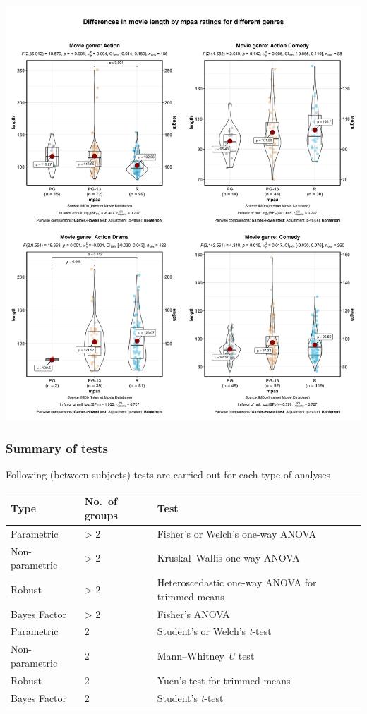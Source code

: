 \documentclass[]{article}
\begin{document}
\includegraphics[width=1\linewidth]{./figures/paper-ggbetweenstats3-1}

\hypertarget{summary-of-tests}{%
\subsubsection{Summary of tests}\label{summary-of-tests}}

Following (between-subjects) tests are carried out for each type of analyses-

\begin{longtable}[]{@{}lll@{}}
\toprule
Type & No.~of groups & Test\tabularnewline
\midrule
\endhead
Parametric & \textgreater{} 2 & Fisher's or Welch's one-way ANOVA\tabularnewline
Non-parametric & \textgreater{} 2 & Kruskal--Wallis one-way ANOVA\tabularnewline
Robust & \textgreater{} 2 & Heteroscedastic one-way ANOVA for trimmed means\tabularnewline
Bayes Factor & \textgreater{} 2 & Fisher's ANOVA\tabularnewline
Parametric & 2 & Student's or Welch's \emph{t}-test\tabularnewline
Non-parametric & 2 & Mann--Whitney \emph{U} test\tabularnewline
Robust & 2 & Yuen's test for trimmed means\tabularnewline
Bayes Factor & 2 & Student's \emph{t}-test\tabularnewline
\bottomrule
\end{longtable}
\end{document}
